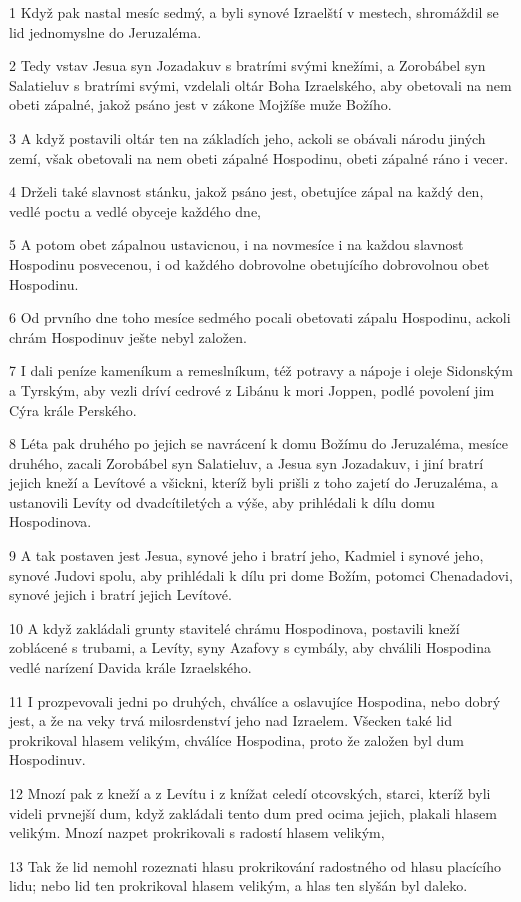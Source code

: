 \par 1 Když pak nastal mesíc sedmý, a byli synové Izraelští v mestech, shromáždil se lid jednomyslne do Jeruzaléma.
\par 2 Tedy vstav Jesua syn Jozadakuv s bratrími svými knežími, a Zorobábel syn Salatieluv s bratrími svými, vzdelali oltár Boha Izraelského, aby obetovali na nem obeti zápalné, jakož psáno jest v zákone Mojžíše muže Božího.
\par 3 A když postavili oltár ten na základích jeho, ackoli se obávali národu jiných zemí, však obetovali na nem obeti zápalné Hospodinu, obeti zápalné ráno i vecer.
\par 4 Drželi také slavnost stánku, jakož psáno jest, obetujíce zápal na každý den, vedlé poctu a vedlé obyceje každého dne,
\par 5 A potom obet zápalnou ustavicnou, i na novmesíce i na každou slavnost Hospodinu posvecenou, i od každého dobrovolne obetujícího dobrovolnou obet Hospodinu.
\par 6 Od prvního dne toho mesíce sedmého pocali obetovati zápalu Hospodinu, ackoli chrám Hospodinuv ješte nebyl založen.
\par 7 I dali peníze kameníkum a remeslníkum, též potravy a nápoje i oleje Sidonským a Tyrským, aby vezli dríví cedrové z Libánu k mori Joppen, podlé povolení jim Cýra krále Perského.
\par 8 Léta pak druhého po jejich se navrácení k domu Božímu do Jeruzaléma, mesíce druhého, zacali Zorobábel syn Salatieluv, a Jesua syn Jozadakuv, i jiní bratrí jejich kneží a Levítové a všickni, kteríž byli prišli z toho zajetí do Jeruzaléma, a ustanovili Levíty od dvadcítiletých a výše, aby prihlédali k dílu domu Hospodinova.
\par 9 A tak postaven jest Jesua, synové jeho i bratrí jeho, Kadmiel i synové jeho, synové Judovi spolu, aby prihlédali k dílu pri dome Božím, potomci Chenadadovi, synové jejich i bratrí jejich Levítové.
\par 10 A když zakládali grunty stavitelé chrámu Hospodinova, postavili kneží zoblácené s trubami, a Levíty, syny Azafovy s cymbály, aby chválili Hospodina vedlé narízení Davida krále Izraelského.
\par 11 I prozpevovali jedni po druhých, chválíce a oslavujíce Hospodina, nebo dobrý jest, a že na veky trvá milosrdenství jeho nad Izraelem. Všecken také lid prokrikoval hlasem velikým, chválíce Hospodina, proto že založen byl dum Hospodinuv.
\par 12 Mnozí pak z kneží a z Levítu i z knížat celedí otcovských, starci, kteríž byli videli prvnejší dum, když zakládali tento dum pred ocima jejich, plakali hlasem velikým. Mnozí nazpet prokrikovali s radostí hlasem velikým,
\par 13 Tak že lid nemohl rozeznati hlasu prokrikování radostného od hlasu placícího lidu; nebo lid ten prokrikoval hlasem velikým, a hlas ten slyšán byl daleko.

